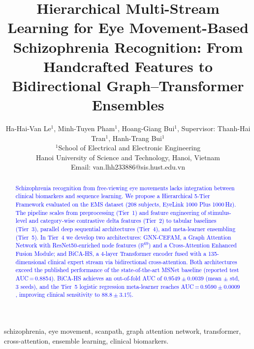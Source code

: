 \documentclass[conference]{IEEEtran}
\newcommand{\rev}[1]{\textcolor{blue}{#1}}
\begin{document}
\title{Hierarchical Multi-Stream Learning for Eye Movement-Based Schizophrenia Recognition: From Handcrafted Features to Bidirectional Graph--Transformer Ensembles}

\author{Ha-Hai-Van Le$^{1}$, Minh-Tuyen Pham$^{1}$, Hoang-Giang Bui$^{1}$,
        Supervisor: Thanh-Hai Tran$^{1}$, Hanh-Trang Bui$^{1}$\\
$^{1}$School of Electrical and Electronic Engineering\\
Hanoi University of Science and Technology, Hanoi, Vietnam\\
Email: van.lhh233886@sis.hust.edu.vn}

\maketitle

\begin{abstract}
\rev{Schizophrenia recognition from free-viewing eye movements lacks integration between clinical biomarkers and sequence learning. We propose a Hierarchical 5-Tier Framework evaluated on the EMS dataset (208 subjects, EyeLink 1000 Plus 1000\,Hz). The pipeline scales from preprocessing (Tier~1) and feature engineering of stimulus-level and category-wise contrastive delta features (Tier~2) to tabular baselines (Tier~3), parallel deep sequential architectures (Tier~4), and meta-learner ensembling (Tier~5). In Tier~4 we develop two architectures: GNN-CEFAM, a Graph Attention Network with ResNet50-enriched node features ($\mathbb{R}^{69}$) and a Cross-Attention Enhanced Fusion Module; and BiCA-HS, a 4-layer Transformer encoder fused with a 135-dimensional clinical expert stream via bidirectional cross-attention. Both architectures exceed the published performance of the state-of-the-art MSNet baseline (reported test AUC\,=\,0.8854). BiCA-HS achieves an out-of-fold AUC of $0.9549 \pm 0.0039$ (mean $\pm$ std, 3 seeds), and the Tier~5 logistic regression meta-learner reaches AUC\,=\,$0.9590 \pm 0.0009$, improving clinical sensitivity to $88.8 \pm 3.1\%$.}
\end{abstract}

\begin{IEEEkeywords}
schizophrenia, eye movement, scanpath, graph attention network, transformer, cross-attention, ensemble learning, clinical biomarkers.
\end{IEEEkeywords}










\end{document}

